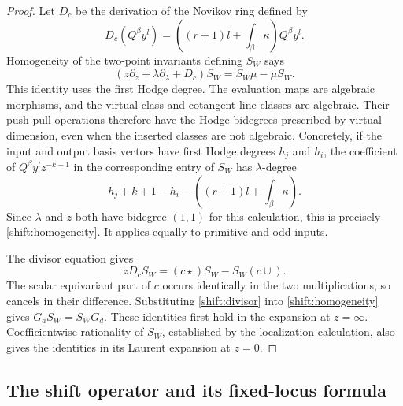 \begin{proof}
Let $D_c$ be the derivation of the Novikov ring defined by
\[
 D_c(Q^\beta y^l)
   =\left((r+1)l+\int_\beta\kappa\right)Q^\beta y^l.
\]
Homogeneity of the two-point invariants defining $S_W$ says
\begin{equation}
 (z\partial_z+\lambda\partial_\lambda+D_c)S_W
                      =S_W\mu-\mu S_W.
 \label{shift:homogeneity}
\end{equation}
This identity uses the first Hodge degree.  The evaluation maps are
algebraic morphisms, and the virtual class and cotangent-line classes
are algebraic.  Their push-pull operations therefore have the Hodge
bidegrees prescribed by virtual dimension, even when the inserted
classes are not algebraic.  Concretely, if the input and output basis
vectors have first Hodge degrees $h_j$ and $h_i$, the coefficient of
$Q^\beta y^l z^{-k-1}$ in the corresponding entry of $S_W$ has
$\lambda$-degree
\[
 h_j+k+1-h_i-\left((r+1)l+\int_\beta\kappa\right).
\]
Since $\lambda$ and $z$ both have bidegree $(1,1)$ for this calculation,
this is precisely \eqref{shift:homogeneity}.  It applies equally to
primitive and odd inputs.

The divisor equation gives
\begin{equation}
             zD_cS_W=(c\star)S_W-S_W(c\cup).
 \label{shift:divisor}
\end{equation}
The scalar equivariant part of $c$ occurs identically in the two
multiplications, so cancels in their difference.  Substituting
\eqref{shift:divisor} into \eqref{shift:homogeneity} gives
$G_aS_W=S_WG_d$.  These identities first hold in the expansion at
$z=\infty$.  Coefficientwise rationality of $S_W$, established by the
localization calculation, also gives the identities in its Laurent
expansion at $z=0$.
\end{proof}

\subsection{The shift operator and its fixed-locus formula}

